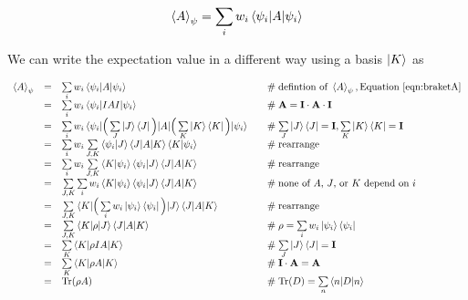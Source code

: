 \documentclass[11pt, oneside]{article}   	%
\begin{document}
\begin{equation}
\braket{A}_{\psi} = \sum\limits_{i} w_i \braket{\psi_i | A | \psi_i}
\label{eqn:braketA}
\end{equation}

\bigskip
\noindent
We can write the expectation value in a different way using a basis $\ket{K}$ as 

\begin{equation*}
\begin{array}{rcll}
\braket{A}_{\psi}
&=& \sum\limits_{i} w_i \braket{\psi_i | A | \psi_i}                                                                          
     & \quad \mathrel{\#} \text{defintion of } \braket{A}_{\psi} , \text{Equation } \ref{eqn:braketA} \\
&=& \sum\limits_{i} w_i \braket{\psi_i | I A I | \psi_i}                                                                      
     & \quad \mathrel{\#} \mathbf{A} = \mathbf{I} \cdot \mathbf{A} \cdot \mathbf{I} \\
&=& \sum\limits_{i} w_i \braket{\psi_i | \Big (  \sum\limits_{J} \ket{J} \bra{J} \Big ) |A | \Big ( \sum\limits_{K} \ket{K} \bra{K} \Big ) | \psi_i}   
     & \quad \mathrel{\#} \sum\limits_{J} \ket{J}\bra{J} = \mathbf{I}, \sum\limits_{K} \ket{K}\bra{K} = \mathbf{I} \\
&=& \sum\limits_{i} w_i \sum\limits_{J,K} \braket{\psi_i | J} \braket{J |A | K} \braket{K | \psi_i}    
     & \quad \mathrel{\#} \text{rearrange} \\
&=& \sum\limits_{i} w_i \sum\limits_{J,K}  \braket{K | \psi_i}   \braket{\psi_i | J} \braket{J |A | K} 
     & \quad \mathrel{\#} \text{rearrange} \\
&=&  \sum\limits_{J,K} \sum\limits_{i} w_i \braket{K | \psi_i}   \braket{\psi_i | J} \braket{J |A | K} 
     & \quad \mathrel{\#} \text{none of $A$, $J$, or $K$ depend on $i$} \\
&=&  \sum\limits_{J,K}  \braket{K | \Big ( \sum\limits_{i} w_i  \ket{\psi_i}\bra{\psi_i}  \Big) | J} \braket{J |A | K} 
     & \quad \mathrel{\#} \text{rearrange} \\
&=& \sum\limits_{J,K} \braket{K | \rho | J} \braket{J | A | K}
     & \quad \mathrel{\#} \rho = \sum\limits_{i} w_i \ket{\psi_i} \bra{\psi_i} \\\
&=& \sum\limits_{K} \braket{K | \rho  I A | K}
     & \quad \mathrel{\#} \sum\limits_{J} \ket{J} \bra{J} = \mathbf{I} \\
&=& \sum\limits_{K} \braket{K | \rho A | K}
     & \quad \mathrel{\#}  \mathbf{I} \cdot \mathbf{A} = \mathbf{A} \\
&=&  \text{Tr}(\rho A)
     & \quad \mathrel{\#} \text{Tr}(D) = \sum\limits_{n} \braket{n | D | n}
\end{array}
\end{equation*}
\end{document}
